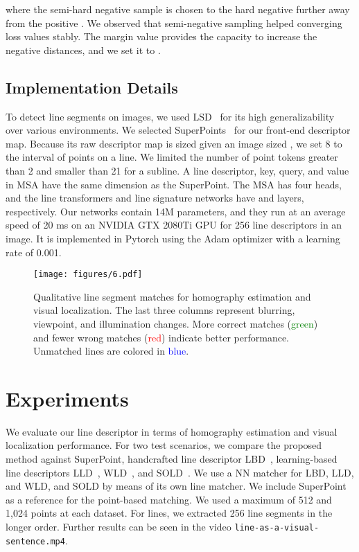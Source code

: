 \documentclass[letterpaper, 10 pt, journal, twoside]{ieeetran}
\begin{document}
where the semi-hard negative sample  is chosen to the hard negative further away from the positive . We observed that semi-negative sampling helped converging loss values stably. The margin value  provides the capacity to increase the negative distances, and we set it to .

\subsection{Implementation Details}

To detect line segments on images, we used \ac{LSD}~\cite{Gioi2010} for its high generalizability over various environments. We selected SuperPoints~\cite{DeTone2017} for our front-end descriptor map. Because its raw descriptor map is sized  given an image sized , we set 8 to the interval of points on a line. We limited the number of point tokens greater than 2 and smaller than 21 for a subline. A line descriptor, key, query, and value in \ac{MSA} have the same dimension  as the SuperPoint. The \ac{MSA} has four heads, and the line transformers and line signature networks have  and  layers, respectively. Our networks contain 14M parameters, and they run at an average speed of 20 ms on an NVIDIA GTX 2080Ti GPU for 256 line descriptors in an image. It is implemented in Pytorch using the Adam optimizer with a learning rate of 0.001.

\begin{figure*}[!t]
	\centering
	\texttt{[image: figures/6.pdf]}
	\caption{Qualitative line segment matches for homography estimation and visual localization. The last three columns represent blurring, viewpoint, and illumination changes. More correct matches (\textcolor{green}{green}) and fewer wrong matches (\textcolor{red}{red}) indicate better performance. Unmatched lines are colored in \textcolor{blue}{blue}. }
	\label{fig:qual}
	\vspace{-5mm}
\end{figure*}




\section{Experiments}
\label{sec:exp}

We evaluate our line descriptor in terms of homography estimation and visual localization performance. For two test scenarios, we compare the proposed method against SuperPoint, handcrafted line descriptor LBD~\cite{LBD2013}, learning-based line descriptors \ac{LLD}~\cite{LLD2019}, \ac{WLD}~\cite{WLD2020}, and SOLD~\cite{Pautrat2021}. We use a \ac{NN} matcher for LBD, LLD, and WLD, and SOLD by means of its own line matcher. We include SuperPoint as a reference for the point-based matching. We used a maximum of 512 and 1,024 points at each dataset. For lines, we extracted 256 line segments in the longer order. Further results can be seen in the video \texttt{line-as-a-visual-sentence.mp4}.
\end{document}

